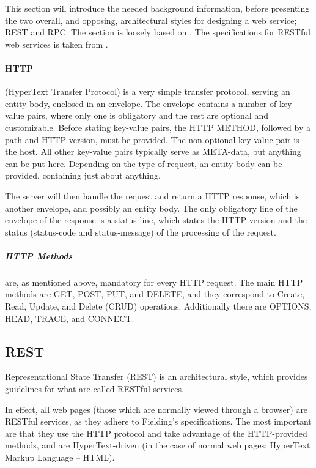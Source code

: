 This section will introduce the needed background information, before presenting the two overall, and opposing, architectural styles for designing a web service; REST and RPC.
The section is loosely based on \citet{restful_web_services}.
The specifications for RESTful web services is taken from \citet{fielding_dissertation}.

\paragraph{HTTP\cite{http_specification}} (HyperText Transfer Protocol) is a very simple transfer protocol, serving an entity body, enclosed in an envelope.
The envelope contains a number of key-value pairs, where only one is obligatory and the rest are optional and customizable.
Before stating key-value pairs, the HTTP METHOD, followed by a path and HTTP version, must be provided.
The non-optional key-value pair is the host.
All other key-value pairs typically serve as META-data, but anything can be put here.
Depending on the type of request, an entity body can be provided, containing just about anything.

The server will then handle the request and return a HTTP response, which is another envelope, and possibly an entity body.
The only obligatory line of the envelope of the response is a status line, which states the HTTP version and the status (status-code and status-message) of the processing of the request.

\subparagraph{HTTP Methods} are, as mentioned above, mandatory for every HTTP request.
The main HTTP methods are GET, POST, PUT, and DELETE, and they correspond to Create, Read, Update, and Delete (CRUD) operations.
Additionally there are OPTIONS, HEAD, TRACE, and CONNECT.

\subsection{REST}
Representational State Transfer (REST) is an architectural style, which provides guidelines for what are called RESTful services.

In effect, all web pages (those which are normally viewed through a browser) are RESTful services, as they adhere to Fielding's specifications.
The most important are that they use the HTTP protocol and take advantage of the HTTP-provided methods, and are HyperText-driven (in the case of normal web pages: HyperText Markup Language -- HTML).


